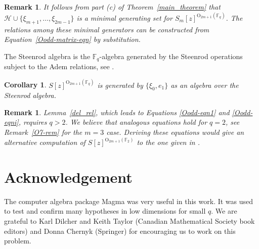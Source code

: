 \documentclass{amsart}
\newtheorem{cor}[subsection]{Corollary}
\newtheorem{remark}[subsection]{Remark}
\newcommand{\field}{\mathbb{F}}
\newcommand{\orth}[2]{{{\text{O}_{{#1}}(\field_{#2})}}}
\renewcommand{\H}{\mathcal{H}}
\begin{document}
\begin{remark} It follows from part (c) of Theorem~\ref{main_theorem} that
$\H\cup\{\xi_{m+1},\ldots,\xi_{2m-1}\}$ is a minimal generating set for
$S_m[z]^{\orth{2m+1}{q}}$. The relations among these minimal generators can be constructed from Equation~\ref{Oodd-matrix-eqn} by substitution.
\end{remark}

The Steenrod algebra is the $\field_q$-algebra generated by the Steenrod operations subject to the Adem relations, see 
\cite[\S 8.2]{neusel+smith-invatheofinigrou:02}.

\begin{cor}
    $S[z]^{\orth{2m+1}{q}}$ is generated by $\{\xi_0,e_1\}$ as an algebra over the Steenrod algebra.
\end{cor}

\begin{remark} Lemma~\ref{del_rel}, which leads to Equations \ref{Oodd-eqn1}
and \ref{Oodd-eqni}, requires $q>2$. We believe that analogous equations hold for $q=2$, see Remark~\ref{O7-rem} for the $m=3$ case. Deriving these equations would give an alternative computation of $S[z]^{\orth{2m+1}{2}}$ to the one given in 
\cite[Theorem~ 6.1]{Kropholler+Rajaei+Segal:05}.
\end{remark}

\section*{Acknowledgement}
  The computer algebra package Magma \cite{magma:97} was very useful in this work.  It was
used to test and confirm many hypotheses in low dimensions for small $q$.
We are grateful to Karl Dilcher and Keith Taylor (Canadian Mathematical Society book editors) and Donna Chernyk (Springer) for encouraging us to work on this problem.


\providecommand{\MR}{\relax\ifhmode\unskip\space\fi MR }
\end{document}
